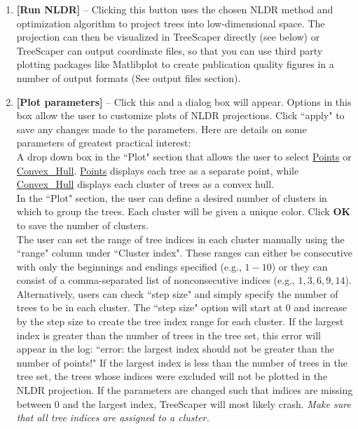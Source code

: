\documentclass[11pt]{article}
\begin{document}
\begin{enumerate}[{\bf 1-}]
\item {\bf [Run NLDR]} -- Clicking this button uses the chosen NLDR method and optimization
algorithm to project trees into low-dimensional space. The projection can then be visualized
in TreeScaper directly (see below) or TreeScaper can output coordinate files, so that you can
use third party plotting packages like Matlibplot to create publication quality figures in a
number of output formats (See output files section).

\item {\bf [Plot parameters]} -- Click this and a dialog box will appear. Options in this box allow the
user to customize plots of NLDR projections. Click ``apply" to save any changes made to the
parameters. Here are details on some parameters of greatest practical interest: \\

A drop down box in the ``Plot" section that allows the user to select \ul{Points} or \ul{Convex\_Hull}.
\ul{Points} displays each tree as a separate point, while \ul{Convex\_Hull} displays each cluster of trees
as a convex hull. \\

In the ``Plot" section, the user can define a desired number of clusters in which to group the
trees. Each cluster will be given a unique color. Click {\bf OK} to save the number of clusters. \\

The user can set the range of tree indices in each cluster manually using the ``range" column
under ``Cluster index". These ranges can either be consecutive with only the beginnings and
endings specified (e.g., $1-10$) or they can consist of a comma-separated list of nonconsecutive indices (e.g., $1, 3, 6, 9, 14$). Alternatively, users can check ``step size" and simply
specify the number of trees to be in each cluster. The ``step size" option will start at $0$ and
increase by the step size to create the tree index range for each cluster. If the largest index is
greater than the number of trees in the tree set, this error will appear in the log: ``error: the
largest index should not be greater than the number of points!" If the largest index is less than
the number of trees in the tree set, the trees whose indices were excluded will not be plotted
in the NLDR projection. If the parameters are changed such that indices are missing between
$0$ and the largest index, TreeScaper will most likely crash. {\it Make sure that all tree indices are
assigned to a cluster.} \\
\end{enumerate}
\end{document}
